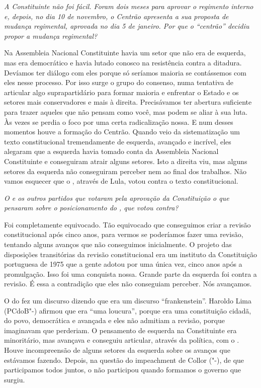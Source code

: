 \medskip

\emph{A Constituinte não foi fácil. Foram dois meses para aprovar o
regimento interno e, depois, no dia 10 de novembro, o Centrão apresenta
a sua proposta de mudança regimental, aprovada no dia 5 de janeiro. Por
que o ``centrão'' decidiu propor a mudança regimental?}

Na Assembleia Nacional Constituinte havia um setor que
não era de esquerda, mas era democrático e havia lutado conosco na
resistência contra a ditadura. Devíamos ter diálogo com eles porque só
seríamos maioria se contássemos com eles nesse processo. Por isso surge
o grupo do consenso, numa tentativa de articular algo suprapartidário
para formar maioria e enfrentar o Estado e os setores mais conservadores
e mais à direita. Precisávamos ter abertura suficiente para trazer
aqueles que não pensam como você, mas podem se aliar à sua luta. Às
vezes se perdia o foco por uma certa radicalização nossa. E num desses
momentos houve a formação do Centrão. Quando veio da sistematização um
texto constitucional tremendamente de esquerda, avançado e incrível,
eles alegaram que a esquerda havia tomado conta da Assembleia Nacional
Constituinte e conseguiram atrair alguns setores. Isto a direita viu,
mas alguns setores da esquerda não conseguiram perceber nem ao final dos
trabalhos. Não vamos esquecer que o , através de Lula, votou contra o
texto constitucional.

\medskip

\emph{O  e os outros partidos que votaram pela aprovação da
Constituição o que pensaram sobre o posicionamento do , que votou
contra?}

Foi completamente equivocado. Tão equivocado que
conseguimos criar a revisão constitucional após cinco anos, para vermos
se poderíamos fazer uma revisão, tentando alguns avanços que não
conseguimos inicialmente. O projeto das disposições transitórias da
revisão constitucional era um instituto da Constituição portuguesa de
1975 que a gente adotou por uma única vez, cinco anos após a
promulgação. Isso foi uma conquista nossa. Grande parte da esquerda foi
contra a revisão. É essa a contradição que eles não conseguiam perceber.
Nós avançamos.

O do fez um discurso dizendo que era um discurso ``frankenstein''.
Haroldo Lima (PCdoB"-) afirmou que era ``uma loucura'', porque era uma
constituição cidadã, do povo, democrática e avançada e eles não admitiam
a revisão, porque imaginavam que perderiam. O pensamento de esquerda na
Constituinte era minoritário, mas avançava e conseguiu articular,
através da política, com o . Houve incompreensão de alguns setores
da esquerda sobre os avanços que estávamos fazendo. Depois, na questão
do impeachment de Collor ("-), de que participamos todos juntos, o
 não participou quando formamos o governo que surgiu.

